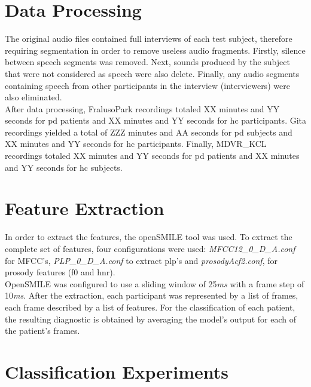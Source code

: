 \section{Data Processing}

The original audio files contained full interviews of each test subject, therefore requiring segmentation in order to remove useless audio fragments. Firstly, silence between speech segments was removed. Next, sounds produced by the subject that were not considered as speech were also delete. Finally, any audio segments containing speech from other participants in the interview (interviewers) were also eliminated.
\\
After data processing, FralusoPark recordings totaled XX minutes and YY seconds for \gls{pd} patients and XX minutes and YY seconds for \gls{hc} participants. Gita recordings yielded a total of ZZZ minutes and AA seconds for \gls{pd} subjects and XX minutes and YY seconds for \gls{hc} participants. Finally, MDVR\_KCL recordings totaled XX minutes and YY seconds for \gls{pd} patients and XX minutes and YY seconds for \gls{hc} subjects.

\section{Feature Extraction}

In order to extract the features, the openSMILE \cite{openSMILE} tool was used. To extract the complete set of features, four configurations were used: \textit{MFCC12\_0\_D\_A.conf} for MFCC's, \textit{PLP\_0\_D\_A.conf} to extract \gls{plp}'s and \textit{prosodyAcf2.conf}, for prosody features (\gls{f0} and \gls{hnr}).
\\
OpenSMILE was configured to use a sliding window of 25\textit{ms} with a frame step of 10\textit{ms}. After the extraction, each participant was represented by a list of frames, each frame described by a list of features. For the classification of each patient, the resulting diagnostic is obtained by averaging the model's output for each of the patient's frames.

\section{Classification Experiments}

